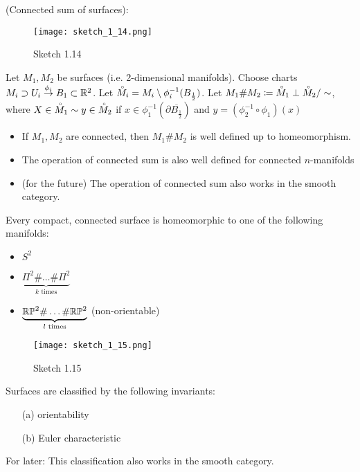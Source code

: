 (Connected sum of surfaces):
\begin{figure}[H]
    \centering
    \texttt{[image: sketch\_1\_14.png]}
    \caption{Sketch 1.14}
\end{figure}
Let \(M_1,M_2\) be surfaces (i.e. 2-dimensional manifolds). Choose charts \(M_i\supset U_i\stackrel{\phi_i}{\to} B_1\subset \mathbb{R}^2\).
Let \(\accentset{\circ}{M}_i = M_i \setminus \phi_i^{-1}(B_{\frac{1}{2}})\). Let \(M_1 \# M_2 \coloneqq \accentset{\circ}{M}_1 \perp \accentset{\circ}{M}_2 /\sim\),
where \(X\in \accentset{\circ}{M}_1 \sim y\in \accentset{\circ}{M}_2\) if \(x\in \phi_1^{-1}(\partial \overline{B_{\frac{1}{2}}})\) and \(y=(\phi_2^{-1}\circ \phi_1) (x)\)

\begin{itemize}
    \item If \(M_1,M_2\) are connected, then \(M_1\# M_2\) is well defined up to 
    homeomorphism.
    \item The operation of connected sum is also well defined for connected \(n\)-manifolds 
    \item (for the future) The operation of connected sum also works in the smooth category.
\end{itemize} 

\begin{theorem}\label{thm:1.10}
    Every compact, connected surface is homeomorphic to one of the following manifolds:
    \begin{itemize}
        \item \(S^2\)
        \item \(\underbrace{\Pi^2\# \dots \# \Pi^2}_{k\text{ times}}\)
        \item \(\underbrace{\mathbb{R}\mathbb{P}^2\# \dots \# \mathbb{R}\mathbb{P}^2}_{l\text{ times}}\) (non-orientable)
    \end{itemize}
    \begin{figure}[H]
        \centering
        \texttt{[image: sketch\_1\_15.png]}
        \caption{Sketch 1.15}
    \end{figure}
\end{theorem}

\begin{remark}
    Surfaces are classified by the following invariants:
    \begin{enumerate}
        \item[(a)] orientability
        \item[(b)] Euler characteristic   
    \end{enumerate}
    For later: This classification also works in the smooth category.
\end{remark}

